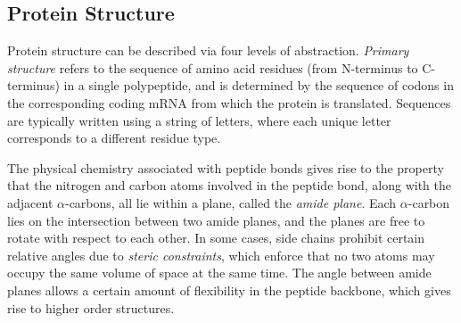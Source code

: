 

\subsection{Protein Structure}

Protein structure can be described via four levels of abstraction. 
\textit{Primary structure} refers to the sequence of amino acid residues (from N-terminus to C-terminus) in a single polypeptide, and is determined by the sequence of codons in the corresponding coding mRNA from which the protein is translated.
Sequences are typically written using a string of letters, where each unique letter corresponds to a different residue type. 

The physical chemistry associated with peptide bonds gives rise to the property that the nitrogen and carbon atoms involved in the peptide bond, along with the adjacent $\alpha$-carbons, all lie within a plane, called the \textit{amide plane}.
Each $\alpha$-carbon lies on the intersection between two amide planes, and the planes are free to rotate with respect to each other. 
In some cases, side chains prohibit certain relative angles due to \textit{steric constraints}, which enforce that no two atoms may occupy the same volume of space at the same time.
The angle between amide planes allows a certain amount of flexibility in the peptide backbone, which gives rise to higher order structures.

